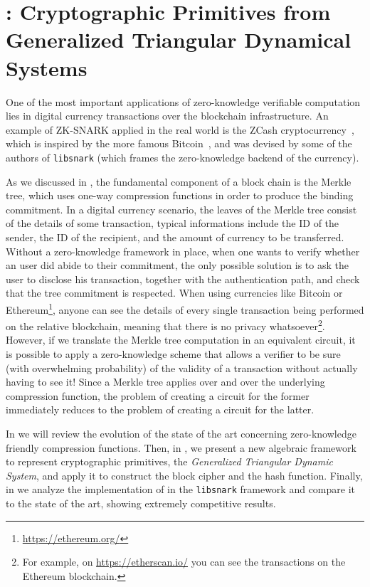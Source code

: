 \chapter{\Arion: Cryptographic Primitives from Generalized Triangular Dynamical Systems}\label{chap:arion}
One of the most important applications of zero-knowledge verifiable computation lies in digital 
currency transactions over the blockchain infrastructure.
An example of ZK-SNARK applied in the real world is the ZCash cryptocurrency~\cite{SassonCGGMTV2014}, 
which is inspired by the more famous Bitcoin~\cite{NarayananBFMG2016}, and was devised by some of 
the authors of \texttt{libsnark} (which frames the zero-knowledge backend of the currency).

As we discussed in , the fundamental component of a block chain is the 
Merkle tree, which uses one-way compression functions in order to produce the binding 
commitment.
In a digital currency scenario, the leaves of the Merkle tree consist of the details of some 
transaction, typical informations include the ID of the sender, the ID of the recipient, and the 
amount of currency to be transferred. 
Without a zero-knowledge framework in place, when one wants to verify whether an user did abide to 
their commitment, the only possible solution is to ask the user to disclose his transaction, 
together with the authentication path, and check that the tree commitment is respected. 
When using currencies like Bitcoin or Ethereum\footnote{\url{https://ethereum.org/}}, anyone 
can see the details of every single transaction being performed on the relative 
blockchain, meaning that there is no privacy whatsoever\footnote{For example, on 
\url{https://etherscan.io/} you can see the transactions on the Ethereum blockchain. %
}.
However, if we translate the Merkle tree computation in an equivalent circuit, it is possible to 
apply a zero-knowledge scheme that allows a verifier to be sure (with overwhelming probability) 
of the validity of a transaction without actually having to see it!
Since a Merkle tree applies over and over the underlying compression function, the problem of 
creating a circuit for the former immediately reduces to the problem of creating a circuit for the 
latter.

In  we will review the evolution of the state of the art concerning zero-knowledge 
friendly compression functions.
Then, in , we present a new algebraic framework to represent cryptographic 
primitives, the \emph{Generalized Triangular Dynamic System}, and apply it to construct the 
\Arion{} block cipher and the \ArionHash{} hash function.
Finally, in  we analyze the implementation of \ArionHash{} in the \texttt{libsnark}
framework and compare it to the state of the art, showing extremely competitive results.



